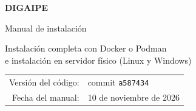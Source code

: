 \documentclass[11pt,a4paper,oneside]{report}
\begin{document}
\begin{titlepage}
	\centering
	\vspace*{3cm}
	{\sffamily\bfseries\Huge DIGAIPE\par}
	\vspace{0.6cm}
	{\sffamily\LARGE Manual de instalación\par}
	\vspace{1.2cm}
	{\large Instalación completa con Docker o Podman\\[0.3em]
		e instalación en servidor físico (Linux y Windows)\par}
	\vfill
	\begin{tabular}{rl}
		Versión del código: & commit \texttt{a587434} \\
		Fecha del manual:   & 10 de noviembre de 2026 \\
	\end{tabular}
	\vspace{2cm}
\end{titlepage}

\tableofcontents














\appendix

\end{document}
